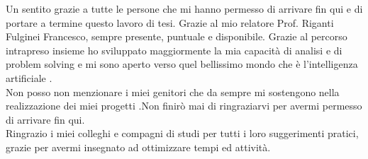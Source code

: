 Un sentito grazie a tutte le persone che mi hanno permesso di arrivare fin qui e di portare a termine questo lavoro di tesi. Grazie al mio relatore Prof. Riganti Fulginei Francesco, sempre presente, puntuale e disponibile. Grazie al percorso intrapreso insieme ho sviluppato maggiormente la mia capacità di analisi e di problem solving e mi sono aperto verso quel bellissimo mondo che è l'intelligenza artificiale .\\ Non posso non menzionare i miei genitori che da sempre mi sostengono nella realizzazione dei miei progetti .Non finirò mai di ringraziarvi per avermi permesso di arrivare fin qui.\\ Ringrazio i miei colleghi e compagni di studi per tutti i loro suggerimenti pratici, grazie per avermi insegnato ad ottimizzare tempi ed attività.